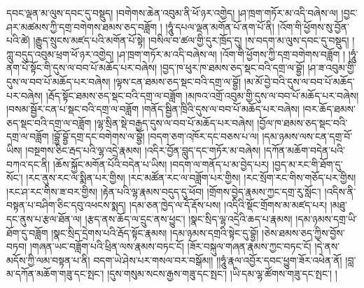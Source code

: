 དབང་ལྡན་མ་ལུས་དབང་དུ་བསྡུད། །བགེགས་ཆེན་འབུམ་ནི་ཕོ་ཉར་འགྱེད། །ཤ་ཁྲག་གཏོར་མ་འདི་བཞེས་ལ། །བྱང་ཤར་མཚམས་ཀྱི་དགྲ་བགེགས་ཐམས་ཅད་བཟློག ། །ཧཱུཾ་དཔལ་ལྡན་མགོན་པོ་ནག་པོ་ནི། །འོག་གི་ཕྱོགས་སུ་བྱོན་པའི་ཚེ། །རྒྱུད་སྲུངས་མཛད་པའི་མགོན་པོ་སྟེ། །བསིལ་བ་ཚལ་གྱི་དུར་ཁྲོད་དུ། །ས་བདག་མ་ལུས་དབང་དུ་བསྡུད། །ཀླུ་བདུད་འབུམ་ཕྲག་ཕོ་ཉར་འགྱེད། །ཤ་ཁྲག་གཏོར་མ་འདི་བཞེས་ལ། །འོག་གི་ཕྱོགས་ཀྱི་དགྲ་བགེགས་བཟློག ། །ཧཱུཾ་ནག་པོ་སྟོང་གི་དུས་ལ་བབ་པོ་མཆོད་པར་བཞེས། །བྱད་ཁ་ཕུར་ཁ་ཐམས་ཅད་སྡང་བའི་དགྲ་ལ་བྷྱོ། །ཤ་ཟ་འབུམ་གྱི་དུས་ལ་བབ་པོ་མཆོད་པར་བཞེས། །ལྟས་ངན་ཐམས་ཅད་སྡང་བའི་དགྲ་ལ་བྷྱོ། །མ་མོ་བྱེ་བའི་དུས་ལ་བབ་པོ་མཆོད་པར་བཞེས། །རྦོད་སྟོང་ཐམས་ཅད་སྡང་བའི་དགྲ་ལ་བཟློག །མཁའ་འགྲོ་འབུམ་གྱི་དུས་ལ་བབ་པོ་མཆོད་པར་བཞེས། །བསམ་སྦྱོར་ངན་པ་སྡང་བའི་དགྲ་ལ་བཟློག །གནོད་སྦྱིན་ཁྲིའི་དུས་ལ་བབ་པོ་མཆོད་པར་བཞེས། །བར་ཆོད་ཐམས་ཅད་སྡང་བའི་དགྲ་ལ་བཟློག །ལྷ་སྲིན་སྡེ་བརྒྱད་དུས་ལ་བབ་པོ་མཆོད་པར་བཞེས། །བྱོལ་ཁ་ཐམས་ཅད་སྡང་བའི་དགྲ་ལ་བཟློག །བྷྱོ་བྷྱོ་དགྲ་དང་བགེགས་ལ་བྷྱོ། །བདག་ཅག་འཁོར་དང་བཅས་པ་ལ། །དམ་ཉམས་ལས་ངན་དགྲ་བོ་ཡིས། །བསྔགས་ཅིང་རྦད་པའི་ལྷ་འདྲེ་རྣམས། །འདིར་བྱོན་བླུད་དང་གཏོར་མ་བཞེས། །དཀོན་མཆོག་བདེན་པའི་བཀའ་དང་ནི། །ཆོས་སྐྱོང་མགོན་པོའི་བདེན་པ་ཡིས། །བདག་ལ་གནོད་པ་མ་བྱེད་པར། །བྱད་མ་རང་གི་ཐོག་དུ་སོང་། །རང་ནུས་རང་ལ་སྨིན་པར་གྱིས། །རང་མཚོན་རང་ལ་བཟློག་པར་གྱིས། །རང་སྲོག་རང་གིས་གཅོད་པར་གྱིས། །རང་ཤ་རང་གིས་ཟ་བར་གྱིས། །རྟེན་པའི་ལྷ་རྣམས་བདུད་དུ་ཕོབ། །གྲོགས་བྱེད་རྣམས་ཀྱང་དགྲ་རུ་སློང་། །འདིས་ནི་བསྟན་པ་བཤིག་ཅིང་དབུ་འཕངས་སྨད། །དམ་ཅན་ཁྱེད་ལ་དོ་རྡོས་པས། །འདིའི་སྡོང་གྲོགས་མ་མཛད་པར། །མཐུ་དང་ནུས་པ་རྩལ་ཐོན་ལ། །རྩད་ནས་ཆོད་ལ་དྲུང་ནས་ཕྱུང་། །སྣང་སྲིད་ལྷ་འདྲེའི་ཆད་པ་རྣམས། །དམ་ཉམས་དགྲ་ཡི་ཐོག་དུ་བཟློག །སྣང་སྲིད་དྲེགས་པའི་རྦོད་སྟོང་རྣམས། །དམ་ཉམས་དགྲའི་སྟེང་དུ་བྷྱོ། །ཅེས་ཐམས་ཅད་ཀྱིས་བྱོས་བཏབ། །གཞན་ཡང་བཟློག་པའི་ཕྲིན་ལས་རྣམས་བཏང་ངོ། །ཟོར་བསྐུལ་གཞན་རྣམས་ཀྱང་བཏང་ངོ། །དེ་ནས་མདོས་ཀྱི་ལམ་བསྟན་པ་ནི། བདག་ཡེ་ཤེས་པར་གསལ་བར་བསྒོམ།། །།ཧཱུཾ་རྣལ་འབྱོར་དབང་ཕྱུག་ཟོར་འཕེན་ནོ། །བླ་མ་དཀོན་མཆོག་གཟུ་དང་སྤང་། །དུས་གསུམ་སངས་རྒྱས་གཟུ་དང་སྤང་། །ཡི་དམ་ལྷ་ཚོགས་གཟུ་དང་སྤང་། །
